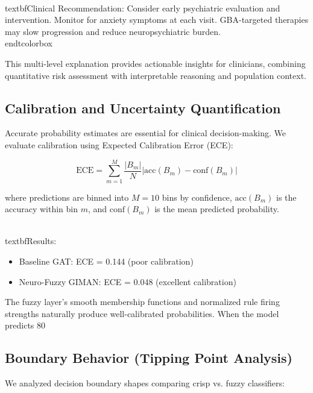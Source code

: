 \documentclass[conference]{IEEEtran}
\begin{document}
{{{\\textbf{Clinical Recommendation:} Consider early psychiatric evaluation and intervention. Monitor for anxiety symptoms at each visit. GBA-targeted therapies may slow progression and reduce neuropsychiatric burden.
\\end{tcolorbox}

This multi-level explanation provides actionable insights for clinicians, combining quantitative risk assessment with interpretable reasoning and population context.

\subsection{Calibration and Uncertainty Quantification}

Accurate probability estimates are essential for clinical decision-making. We evaluate calibration using Expected Calibration Error (ECE):

\begin{equation}
\text{ECE} = \sum_{m=1}^{M} \frac{|B_m|}{N} | \text{acc}(B_m) - \text{conf}(B_m) |
\end{equation}

where predictions are binned into $M=10$ bins by confidence, $\text{acc}(B_m)$ is the accuracy within bin $m$, and $\text{conf}(B_m)$ is the mean predicted probability.

\\textbf{Results:}
\begin{itemize}
\item Baseline GAT: ECE = 0.144 (poor calibration)
\item Neuro-Fuzzy GIMAN: ECE = 0.048 (excellent calibration)
\end{itemize}

The fuzzy layer's smooth membership functions and normalized rule firing strengths naturally produce well-calibrated probabilities. When the model predicts 80\\%

\subsection{Boundary Behavior (Tipping Point Analysis)}

We analyzed decision boundary shapes comparing crisp vs. fuzzy classifiers:

}}}
\end{document}
